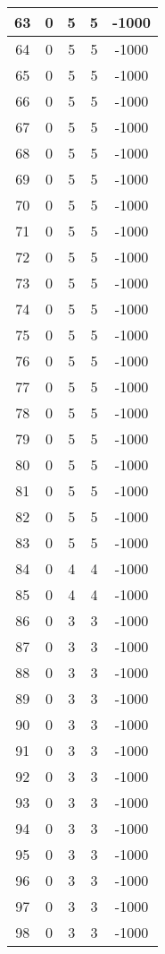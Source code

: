 \documentclass[letterpaper, 12pt]{article}
\begin{document}
\begin{longtable}{|c|c|c|c|c|}
\hline
63 & 0 & 5 & 5 & -1000 \\
\hline
64 & 0 & 5 & 5 & -1000 \\
\hline
65 & 0 & 5 & 5 & -1000 \\
\hline
66 & 0 & 5 & 5 & -1000 \\
\hline
67 & 0 & 5 & 5 & -1000 \\
\hline
68 & 0 & 5 & 5 & -1000 \\
\hline
69 & 0 & 5 & 5 & -1000 \\
\hline
70 & 0 & 5 & 5 & -1000 \\
\hline
71 & 0 & 5 & 5 & -1000 \\
\hline
72 & 0 & 5 & 5 & -1000 \\
\hline
73 & 0 & 5 & 5 & -1000 \\
\hline
74 & 0 & 5 & 5 & -1000 \\
\hline
75 & 0 & 5 & 5 & -1000 \\
\hline
76 & 0 & 5 & 5 & -1000 \\
\hline
77 & 0 & 5 & 5 & -1000 \\
\hline
78 & 0 & 5 & 5 & -1000 \\
\hline
79 & 0 & 5 & 5 & -1000 \\
\hline
80 & 0 & 5 & 5 & -1000 \\
\hline
81 & 0 & 5 & 5 & -1000 \\
\hline
82 & 0 & 5 & 5 & -1000 \\
\hline
83 & 0 & 5 & 5 & -1000 \\
\hline
84 & 0 & 4 & 4 & -1000 \\
\hline
85 & 0 & 4 & 4 & -1000 \\
\hline
86 & 0 & 3 & 3 & -1000 \\
\hline
87 & 0 & 3 & 3 & -1000 \\
\hline
88 & 0 & 3 & 3 & -1000 \\
\hline
89 & 0 & 3 & 3 & -1000 \\
\hline
90 & 0 & 3 & 3 & -1000 \\
\hline
91 & 0 & 3 & 3 & -1000 \\
\hline
92 & 0 & 3 & 3 & -1000 \\
\hline
93 & 0 & 3 & 3 & -1000 \\
\hline
94 & 0 & 3 & 3 & -1000 \\
\hline
95 & 0 & 3 & 3 & -1000 \\
\hline
96 & 0 & 3 & 3 & -1000 \\
\hline
97 & 0 & 3 & 3 & -1000 \\
\hline
98 & 0 & 3 & 3 & -1000 \\

\end{longtable}
\end{document}
